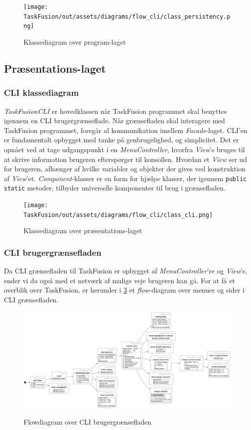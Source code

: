 \begin{figure}[H]
    \centering
    \caption{Klassediagram over program-laget}
    \texttt{[image: TaskFusion/out/assets/diagrams/flow\_cli/class\_persistency.png]}
    \label{fig:class_persistency}
\end{figure}

\subsection{Præsentations-laget}

\subsubsection{CLI klassediagram}
\textit{TaskFusionCLI} er hovedklassen når TaskFusion programmet skal benyttes igennem en CLI brugergrænseflade. Når grænsefladen skal interagere med TaskFusion programmet, foregår al kommunikation imellem \textit{Facade}-laget. CLI'en er fundamentalt opbygget med tanke på genbrugelighed, og simplicitet. Det er opnået ved at tage udgangspunkt i en \textit{MenuController}, hvorfra \textit{View}'s bruges til at skrive information brugeren efterspørger til konsollen. Hvordan et \textit{View} ser ud for brugeren, afhænger af hvilke variabler og objekter der gives ved konstruktion af \textit{View}'et. \textit{Component}-klasser er en form for hjælpe klasser, der igennem \texttt{public static} metoder, tilbyder universelle komponenter til brug i grænsefladen.

\begin{figure}[H]
    \centering
    \caption{Klassediagram over præsentations-laget}
    \texttt{[image: TaskFusion/out/assets/diagrams/flow\_cli/class\_cli.png]}
    \label{fig:class_cli}
\end{figure}

\subsubsection{CLI brugergrænsefladen}
Da CLI grænsefladen til TaskFusion er opbygget af \textit{MenuController}'re og \textit{View}'s, ender vi da også med et netværk af mulige veje brugeren kan gå. For at få et overblik over TaskFusion, er herunder i \ref{fig:flow_cli} et \textit{flow}-diagram over menuer og sider i CLI grænsefladen.  
\begin{figure}[H]
    \centering
    \caption{Flowdiagram over CLI brugergrænsefladen}
    \includegraphics[width = \textwidth, keepaspectratio]{TaskFusion/out/assets/diagrams/flow_cli/flow_cli.png}
    \label{fig:flow_cli}
\end{figure}

